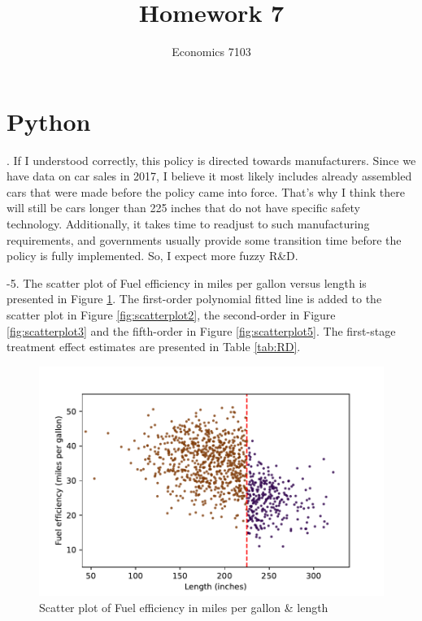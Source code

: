 \documentclass{article}
\title{Homework 7}
\author{Economics 7103}
\begin{document}
  
\maketitle

\section{Python}
. If I understood correctly, this policy is directed towards manufacturers. Since we have data on car sales in 2017, I believe it most likely includes already assembled cars that were made before the policy came into force. That's why I think there will still be cars longer than 225 inches that do not have specific safety technology. Additionally, it takes time to readjust to such manufacturing requirements, and governments usually provide some transition time before the policy is fully implemented. So, I expect more fuzzy R\&D.


-5. The scatter plot of Fuel efficiency in miles per gallon versus length is presented in Figure \ref{fig:scatterplot1}. The first-order polynomial fitted line is added to the scatter plot in Figure \ref{fig:scatterplot2}, the second-order in Figure \ref{fig:scatterplot3} and the fifth-order in Figure \ref{fig:scatterplot5}.  The first-stage treatment effect estimates are presented in Table \ref{tab:RD}. 

\begin{figure}[h!]
    \centering
    \includegraphics{homework 7/output/figure/scatterplot1.pdf}
    \caption{Scatter plot of Fuel efficiency in miles per gallon \& length}
    \label{fig:scatterplot1}
\end{figure}
\end{document}
